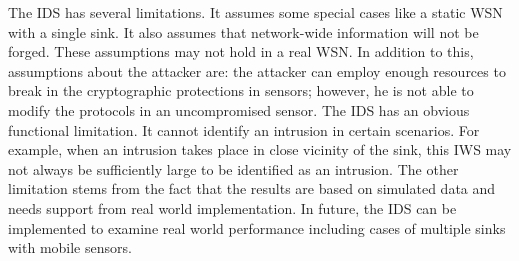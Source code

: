 \documentclass[conference]{IEEEtran}
\begin{document}
The IDS has several limitations. 
It assumes some special cases like a static WSN with a single sink.
It also assumes that network-wide information will not be forged. %
These assumptions may not hold in a real WSN.
In addition to this, assumptions about the attacker are: the attacker can employ enough resources to break in the cryptographic protections in sensors; however, he is not able to modify the protocols in an uncompromised sensor.
The IDS has an obvious functional limitation.
It cannot identify an intrusion in certain scenarios.
For example, when an intrusion takes place in close vicinity of the sink, this IWS may not always be sufficiently large to be identified as an intrusion.
The other limitation stems from the fact that the results are based on simulated data and needs support from real world implementation.
In future,  the IDS can be implemented to examine real world performance including cases of multiple sinks with mobile sensors.






\IEEEtriggercmd{\enlargethispage{-5in}}






\end{document}
